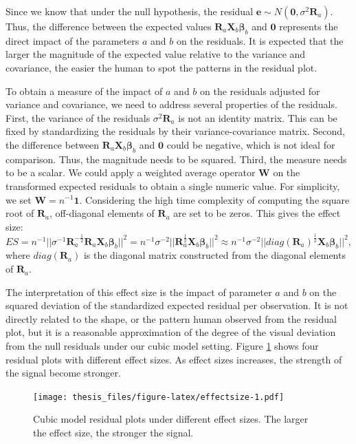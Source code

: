 \documentclass{monashthesis}
\theoremstyle{definition}
\theoremstyle{definition}
\theoremstyle{definition}
\theoremstyle{definition}
\theoremstyle{remark}
\begin{document}
Since we know that under the null hypothesis, the residual \(\boldsymbol{e}\sim N(\boldsymbol{0},\sigma^2\boldsymbol{R}_a)\). Thus, the difference between the expected values \(\boldsymbol{R}_a\boldsymbol{X}_b\boldsymbol{\beta}_b\) and \(\boldsymbol{0}\) represents the direct impact of the parameters \(a\) and \(b\) on the residuals. It is expected that the larger the magnitude of the expected value relative to the variance and covariance, the easier the human to spot the patterns in the residual plot.

To obtain a measure of the impact of \(a\) and \(b\) on the residuals adjusted for variance and covariance, we need to address several properties of the residuals. First, the variance of the residuals \(\sigma^2\boldsymbol{R}_a\) is not an identity matrix. This can be fixed by standardizing the residuals by their variance-covariance matrix. Second, the difference between \(\boldsymbol{R}_a\boldsymbol{X}_b\boldsymbol{\beta}_b\) and \(\boldsymbol{0}\) could be negative, which is not ideal for comparison. Thus, the magnitude needs to be squared. Third, the measure needs to be a scalar. We could apply a weighted average operator \(\boldsymbol{W}\) on the transformed expected residuals to obtain a single numeric value. For simplicity, we set \(\boldsymbol{W}=n^{-1}\boldsymbol{1}\). Considering the high time complexity of computing the square root of \(\boldsymbol{R}_a\), off-diagonal elements of \(\boldsymbol{R}_a\) are set to be zeros. This gives the effect size: \[ES=n^{-1}||\sigma^{-1}\boldsymbol{R}_a^{-\frac{1}{2}}\boldsymbol{R}_a\boldsymbol{X}_b\boldsymbol{\beta}_b||^2=n^{-1}\sigma^{-2}||\boldsymbol{R}_a^{\frac{1}{2}}\boldsymbol{X}_b\boldsymbol{\beta}_b||^2\approx n^{-1}\sigma^{-2}||diag(\boldsymbol{R}_a)^{\frac{1}{2}}\boldsymbol{X}_b\boldsymbol{\beta}_b||^2,\] where \(diag(\boldsymbol{R}_a)\) is the diagonal matrix constructed from the diagonal elements of \(\boldsymbol{R}_a\).

The interpretation of this effect size is the impact of parameter \(a\) and \(b\) on the squared deviation of the standardized expected residual per observation. It is not directly related to the shape, or the pattern human observed from the residual plot, but it is a reasonable approximation of the degree of the visual deviation from the null residuals under our cubic model setting. Figure \ref{fig:effectsize} shows four residual plots with different effect sizes. As effect sizes increases, the strength of the signal become stronger.

\begin{figure}
\centering
\texttt{[image: thesis\_files/figure-latex/effectsize-1.pdf]}
\caption{\label{fig:effectsize}Cubic model residual plots under different effect sizes. The larger the effect size, the stronger the signal.}
\end{figure}
\end{document}
